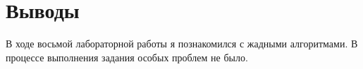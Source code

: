 
\section{Выводы}
В ходе восьмой лабораторной работы я познакомился с жадными алгоритмами. В процессе выполнения задания особых проблем не было.
\pagebreak
